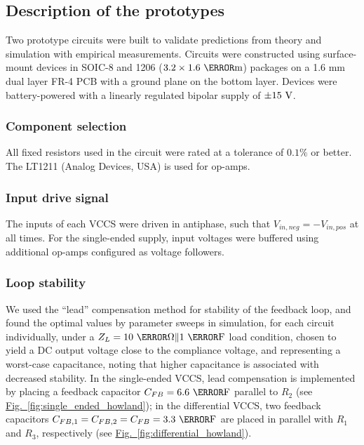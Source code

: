 \documentclass[conference]{IEEEtran}
\newcommand{\brieffiglink}[1]{\hyperref[#1]{Fig.~\ref*{#1}}}
\begin{document}
\subsection{Description of the prototypes}
\label{sec:description_of_the_prototype}

Two prototype circuits were built to validate predictions from theory and simulation with empirical measurements. Circuits were constructed using surface-mount devices in SOIC-8 and 1206 ($3.2\times1.6~\milli\meter$) packages on a 1.6 mm dual layer FR-4 PCB with a ground plane on the bottom layer. Devices were battery-powered with a linearly regulated bipolar supply of $\pm15~\volt$.

\subsubsection{Component selection}

All fixed resistors used in the circuit were rated at a tolerance of $0.1\%$ or better. The LT1211 (Analog Devices, USA) is used for op-amps.

\subsubsection{Input drive signal}

The inputs of each VCCS were driven in antiphase, such that $V_{in,neg}=-V_{in,pos}$ at all times. For the single-ended supply, input voltages were buffered using additional op-amps configured as voltage followers.

\subsubsection{Loop stability}

We used the ``lead'' compensation method for stability of the feedback loop, and found the optimal values by parameter sweeps in simulation, for each circuit individually, under a $Z_L=10~\kilo\ohm\|1~\micro\farad$ load condition, chosen to yield a DC output voltage close to the compliance voltage, and representing a worst-case capacitance, noting that higher capacitance is associated with decreased stability. In the single-ended VCCS, lead compensation is implemented by placing a feedback capacitor $C_{FB}=6.6~\pico\farad$ parallel to $R_2$ (see \brieffiglink{fig:single_ended_howland}); in the differential VCCS, two feedback capacitors $C_{FB,1}=C_{FB,2}=C_{FB}=3.3~\pico\farad$ are placed in parallel with $R_1$ and $R_3$, respectively (see \brieffiglink{fig:differential_howland}).
\end{document}
